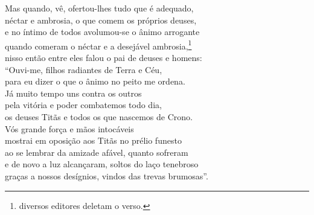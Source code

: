\quad{}Mas quando, vê, ofertou-lhes tudo que é adequado,\\
néctar e ambrosia, o que comem os próprios deuses, \\
e no íntimo de todos avolumou-se o ânimo arrogante\\
quando comeram o néctar e a desejável ambrosia,\footnote{diversos editores deletam o verso.}\\
nisso então entre eles falou o pai de deuses e homens:\\
``Ouvi-me, filhos radiantes de Terra e Céu,\\
para eu dizer o que o ânimo no peito me ordena. \\
Já muito tempo uns contra os outros\\
pela vitória e poder combatemos todo dia,\\
os deuses Titãs e todos os que nascemos de Crono.\\
Vós grande força e mãos intocáveis\\
mostrai em oposição aos Titãs no prélio funesto \\
ao se lembrar da amizade afável, quanto sofreram\\
e de novo a luz alcançaram, soltos do laço tenebroso\\
graças a nossos desígnios, vindos das trevas brumosas''.

